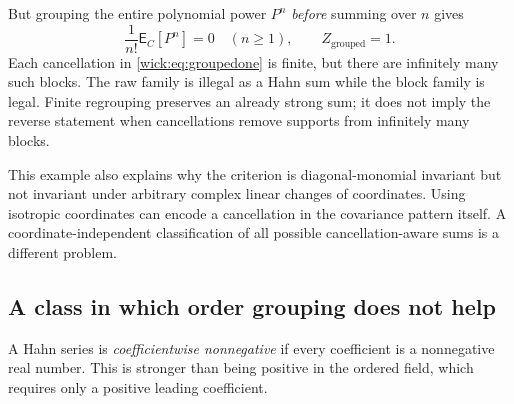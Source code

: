 \documentclass[11pt,letterpaper]{article}
\numberwithin{equation}{section}
\theoremstyle{definition}
\theoremstyle{remark}
\newcommand{\EE}{\mathsf E}
\begin{document}
But grouping the entire polynomial power $P^n$ \emph{before} summing over
$n$ gives
\begin{equation}
 \frac1{n!}\EE_C[P^n]=0\quad(n\ge1),\qquad
 Z_{\mathrm{grouped}}=1.
 \label{wick:eq:groupedone}
\end{equation}
Each cancellation in \eqref{wick:eq:groupedone} is finite, but there are
infinitely many such blocks. The raw family is illegal as a Hahn sum while
the block family is legal. Finite regrouping preserves an already strong
sum; it does not imply the reverse statement when cancellations remove
supports from infinitely many blocks.

This example also explains why the criterion is diagonal-monomial invariant
but not invariant under arbitrary complex linear changes of coordinates.
Using isotropic coordinates can encode a cancellation in the covariance
pattern itself. A coordinate-independent classification of all possible
cancellation-aware sums is a different problem.

\subsection{A class in which order grouping does not help}

A Hahn series is \emph{coefficientwise nonnegative} if every coefficient is
a nonnegative real number. This is stronger than being positive in the
ordered field, which requires only a positive leading coefficient.
\end{document}
